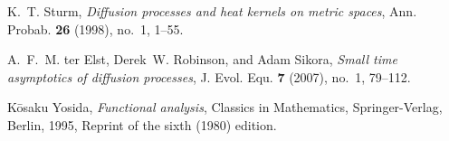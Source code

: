 \begin{thebibliography}{AKM06}
K.~T. Sturm, \emph{Diffusion processes and heat kernels on metric spaces}, Ann.
  Probab. \textbf{26} (1998), no.~1, 1--55. 

A.~F.~M. ter Elst, Derek~W. Robinson, and Adam Sikora, \emph{Small time
  asymptotics of diffusion processes}, J. Evol. Equ. \textbf{7} (2007), no.~1,
  79--112. 

K\=osaku Yosida, \emph{Functional analysis}, Classics in Mathematics,
  Springer-Verlag, Berlin, 1995, Reprint of the sixth (1980) edition.

\end{thebibliography}

